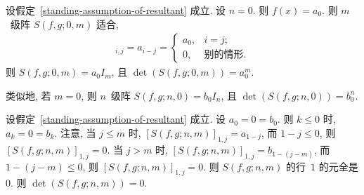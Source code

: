 \documentclass[../libro.tex]{subfiles}
\begin{document}
\begin{example}\label{emp:morniszero}
    设假定~\ref{standing-assumption-of-resultant} 成立.
    设 \(n = 0\).
    则 \(f(x) = a_0\).
    则 \(m\)~级阵 \(S(f, g; \allowbreak
    0, m)\) 适合,
    \begin{align*}
        [S(f, g; 0, m)]_{i,j} = a_{i-j} =
        \begin{cases}
            a_0, & i = j;       \\
            0,   & \text{别的情形}.
        \end{cases}
    \end{align*}
    则 \(S(f, g; 0, m) = a_0 I_m\),
    且 \(\det {(S(f, g; 0, m))} = a_0^m\).

    类似地, 若 \(m = 0\),
    则 \(n\)~级阵 \(S(f, g; n, 0) = b_0 I_n\),
    且 \(\det {(S(f, g; n, 0))} = b_0^n\).
\end{example}

\begin{example}
    设假定~\ref{standing-assumption-of-resultant} 成立.
    设 \(a_0 = 0 = b_0\).
    则 \(k \leq 0\) 时, \(a_k = 0 = b_k\).
    注意, 当 \(j \leq m\) 时,
    \([S(f, g; n, m)]_{1,j} \allowbreak
    = a_{1-j}\),
    而 \(1 - j \leq 0\),
    则 \([S(f, g; n, m)]_{1,j} \allowbreak
    = 0\).
    当 \(j > m\) 时,
    \([S(f, g; n, m)]_{1,j} \allowbreak
    = b_{1 - (j - m)}\),
    而 \(1 - (j - m) \leq 0\),
    则 \([S(f, g; n, m)]_{1,j} \allowbreak
    = 0\).
    则 \(S(f, g; n, m)\) 的行~\(1\) 的元全是 \(0\).
    则 \(\det {(S(f, g; n, m))} = 0\).
\end{example}
\end{document}
